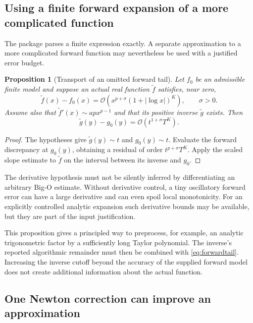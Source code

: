 \documentclass[11pt,a4paper]{article}
\newtheorem{proposition}[theorem]{Proposition}
\theoremstyle{definition}
\theoremstyle{remark}
\newcommand{\OO}{\mathcal O}
\begin{document}
\subsection{Using a finite forward expansion of a more complicated function}

The package parses a finite expression exactly. A separate approximation to a
more complicated forward function may nevertheless be used with a justified
error budget.

\begin{proposition}[Transport of an omitted forward tail]\label{prop:forwardtail}
Let $f_0$ be an admissible finite model and suppose an actual real function
$\widetilde f$ satisfies, near zero,
\[
 \widetilde f(x)-f_0(x)=\OO(x^{p+\sigma}(1+|\log x|)^K),\qquad \sigma>0.
\]
Assume also that $\widetilde f'(x)\sim apx^{p-1}$ and that its positive inverse
$\widetilde g$ exists. Then
\begin{equation}\label{eq:forwardtail}
 \widetilde g(y)-g_0(y)=\OO(t^{1+\sigma}T^K).
\end{equation}
\end{proposition}

\begin{proof}
The hypotheses give $\widetilde g(y)\sim t$ and $g_0(y)\sim t$. Evaluate the
forward discrepancy at $g_0(y)$, obtaining a residual of order
$t^{p+\sigma}T^K$. Apply the scaled slope estimate to $\widetilde f$ on the
interval between its inverse and $g_0$.
\end{proof}

The derivative hypothesis must not be silently inferred by differentiating an
arbitrary Big-O estimate. Without derivative control, a tiny oscillatory
forward error can have a large derivative and can even spoil local
monotonicity. For an explicitly controlled analytic expansion such derivative
bounds may be available, but they are part of the input justification.

This proposition gives a principled way to preprocess, for example, an
analytic trigonometric factor by a sufficiently long Taylor polynomial. The
inverse's reported algorithmic remainder must then be combined with
\eqref{eq:forwardtail}. Increasing the inverse cutoff beyond the accuracy of
the supplied forward model does not create additional information about the
actual function.

\subsection{One Newton correction can improve an approximation}
\end{document}
